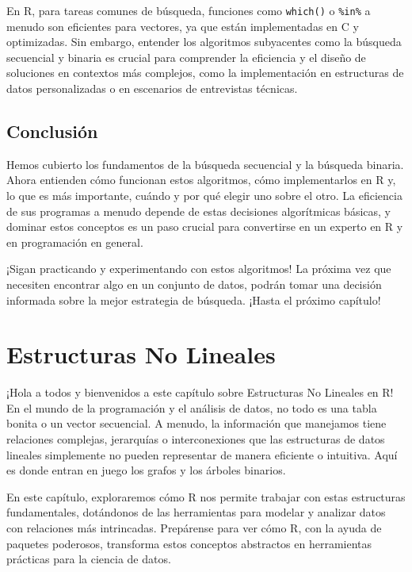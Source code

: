 \documentclass[
  spanish,
  letterpaper,
  DIV=11,
  numbers=noendperiod]{scrreprt}
\begin{document}
En R, para tareas comunes de búsqueda, funciones como \texttt{which()} o
\texttt{\%in\%} a menudo son eficientes para vectores, ya que están
implementadas en C y optimizadas. Sin embargo, entender los algoritmos
subyacentes como la búsqueda secuencial y binaria es crucial para
comprender la eficiencia y el diseño de soluciones en contextos más
complejos, como la implementación en estructuras de datos personalizadas
o en escenarios de entrevistas técnicas.

\section{Conclusión}\label{conclusiuxf3n-2}

Hemos cubierto los fundamentos de la búsqueda secuencial y la búsqueda
binaria. Ahora entienden cómo funcionan estos algoritmos, cómo
implementarlos en R y, lo que es más importante, cuándo y por qué elegir
uno sobre el otro. La eficiencia de sus programas a menudo depende de
estas decisiones algorítmicas básicas, y dominar estos conceptos es un
paso crucial para convertirse en un experto en R y en programación en
general.

¡Sigan practicando y experimentando con estos algoritmos! La próxima vez
que necesiten encontrar algo en un conjunto de datos, podrán tomar una
decisión informada sobre la mejor estrategia de búsqueda. ¡Hasta el
próximo capítulo!


\chapter{Estructuras No Lineales}\label{estructuras-no-lineales}

¡Hola a todos y bienvenidos a este capítulo sobre Estructuras No
Lineales en R! En el mundo de la programación y el análisis de datos, no
todo es una tabla bonita o un vector secuencial. A menudo, la
información que manejamos tiene relaciones complejas, jerarquías o
interconexiones que las estructuras de datos lineales simplemente no
pueden representar de manera eficiente o intuitiva. Aquí es donde entran
en juego los grafos y los árboles binarios.

En este capítulo, exploraremos cómo R nos permite trabajar con estas
estructuras fundamentales, dotándonos de las herramientas para modelar y
analizar datos con relaciones más intrincadas. Prepárense para ver cómo
R, con la ayuda de paquetes poderosos, transforma estos conceptos
abstractos en herramientas prácticas para la ciencia de datos.
\end{document}
